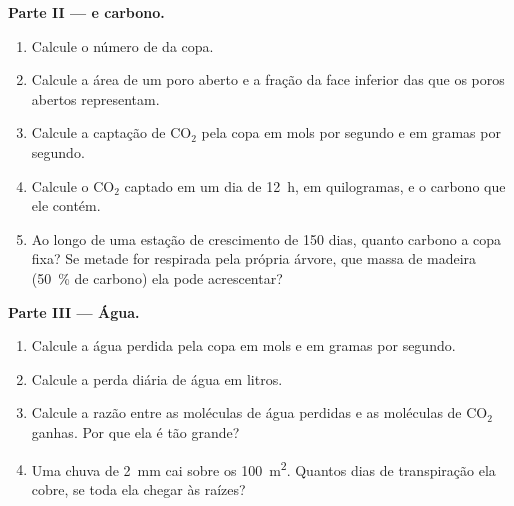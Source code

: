 \begin{problem}
\medskip
\noindent\textbf{Parte II ---  e carbono.}
\begin{enumerate}[resume]
  \item Calcule o número de  da copa.
  \item Calcule a área de um poro aberto e a fração da face inferior das
         que os poros abertos representam.
  \item Calcule a captação de $\mathrm{CO_2}$ pela copa em mols por
        segundo e em gramas por segundo.
  \item Calcule o $\mathrm{CO_2}$ captado em um dia de \qty{12}{h}, em
        quilogramas, e o carbono que ele contém.
  \item Ao longo de uma estação de crescimento de \qty{150}{} dias,
        quanto carbono a copa fixa? Se metade for respirada pela própria
        árvore, que massa de madeira (\qty{50}{\%} de carbono) ela pode
        acrescentar?
\end{enumerate}

\medskip
\noindent\textbf{Parte III --- Água.}
\begin{enumerate}[resume]
  \item Calcule a água perdida pela copa em mols e em gramas por
        segundo.
  \item Calcule a perda diária de água em litros.
  \item Calcule a razão entre as moléculas de água perdidas e as
        moléculas de $\mathrm{CO_2}$ ganhas. Por que ela é tão grande?
  \item Uma chuva de \qty{2}{mm} cai sobre os \qty{100}{m^2}. Quantos
        dias de transpiração ela cobre, se toda ela chegar às raízes?
\end{enumerate}


\end{problem}

